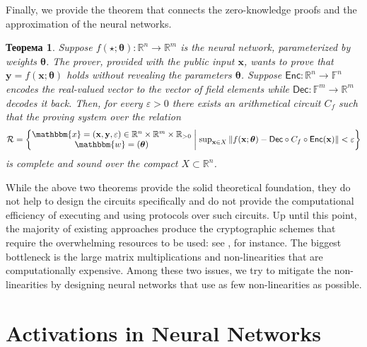 \documentclass[12pt,a4paper,oneside]{book}
\theoremstyle{dplplain}
\newtheorem{theorem}{Теорема}[chapter]
\theoremstyle{dpldefinition}
\theoremstyle{dplremark}
\begin{document}
Finally, we provide the theorem that connects the zero-knowledge proofs and
the approximation of the neural networks.

\begin{theorem}
    Suppose $f(\star; \boldsymbol{\theta}): \mathbb{R}^n \to \mathbb{R}^m$ is
    the neural network, parameterized by weights $\boldsymbol{\theta}$. The
    prover, provided with the public input $\mathbf{x}$, wants to prove that
    $\mathbf{y} = f(\mathbf{x}; \boldsymbol{\theta})$ holds without revealing
    the parameters $\boldsymbol{\theta}$. Suppose $\mathsf{Enc}: \mathbb{R}^n
    \to \mathbb{F}^n$ encodes the real-valued vector to the vector of field
    elements while $\mathsf{Dec}: \mathbb{F}^m \to \mathbb{R}^m$ decodes it
    back. Then, for every $\varepsilon > 0$ there exists an arithmetical circuit
    $C_f$ such that the proving system over the relation
    \begin{equation*}
        \mathcal{R} = \left\{ \begin{matrix}
            \mathbbm{x} = (\mathbf{x}, \mathbf{y}, \varepsilon) \in \mathbb{R}^{n} \times \mathbb{R}^m \times \mathbb{R}_{> 0} \\
            \mathbbm{w} = (\boldsymbol{\theta})
        \end{matrix} \; \middle| \; \begin{matrix}
            \sup_{\mathbf{x} \in X}\left\|f(\mathbf{x}; \boldsymbol{\theta}) - \mathsf{Dec} \circ C_f \circ \mathsf{Enc}(\mathbf{x})\right\| < \varepsilon
        \end{matrix} \right\}
    \end{equation*}
    is complete and sound over the compact $X \subset \mathbb{R}^n$.
\end{theorem}

While the above two theorems provide the solid theoretical foundation, they do
not help to design the circuits specifically and do not provide the
computational efficiency of executing and using protocols over such circuits. Up
until this point, the majority of existing approaches produce the cryptographic
schemes that require the overwhelming resources to be used: see \cite{zkml}, for
instance. The biggest bottleneck is the large matrix multiplications and 
non-linearities that are computationally expensive. Among these two issues,
we try to mitigate the non-linearities by designing neural networks 
that use as few non-linearities as possible.

\section{Activations in Neural Networks}
\end{document}
